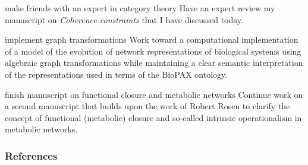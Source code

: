 \begin{frame}
\begin{block}{make friends with an expert in category theory}
Have an expert review my manuscript on {\it Coherence constraints} that I have discussed today.
\end{block}
\begin{block}{implement graph transformations}
Work toward a computational implementation of a model of the evolution of network representations of biological systems using algebraic graph transformations while maintaining a clear semantic interpretation of the representations used in terms of the BioPAX ontology.
\end{block}
\begin{block}{finish manuscript on functional closure and metabolic networks}
Continue work on a second manuscript that builds upon the work of Robert Rosen to clarify the concept of functional (metabolic) closure and so-called intrinsic operationalism in metabolic networks.
\end{block}
\end{frame}

\begin{frame}[allowframebreaks]
        \frametitle{References}
         
		
\end{frame}